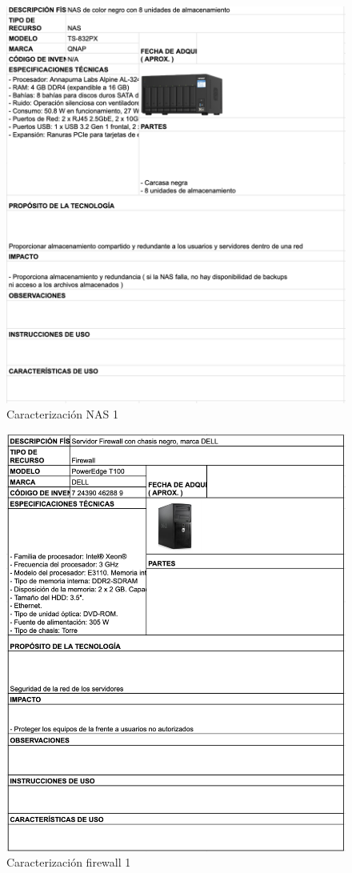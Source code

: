 \begin{figure}[H]
    \centering
    \includegraphics[width=\textwidth] {tablas-images/cp1/NAS/nas-1.png}
    \caption{Caracterización NAS 1}\label{fig:nas-1}
\end{figure}

\begin{figure}[H]
    \centering
    \includegraphics[width=\textwidth] {tablas-images/cp1/firewall/firewall.png}
    \caption{Caracterización firewall 1}\label{fig:firewall-1}
\end{figure}